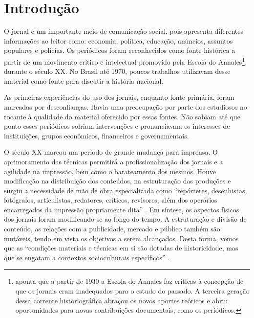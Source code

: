 \begin{refsection}
\begin{otherlanguage}{english}
    \end{otherlanguage}

    \section{Introdução}

    O jornal é um importante meio de comunicação social, pois apresenta diferentes informações ao leitor como: economia, política, educação, anúncios, assuntos populares e policias. Os periódicos foram reconhecidos como fonte histórica a partir de um movimento crítico e intelectual promovido pela Escola do Annales\footnote{\textcite{Lapuente2016Imprensa} aponta que a partir de 1930 a Escola do Annales faz críticas à concepção de que os jornais eram inadequados para o estudo do passado. A terceira geração dessa corrente historiográfica abraçou os novos aportes teóricos e abriu oportunidades para novas contribuições documentais, como os periódicos.}, durante o século XX. No Brasil até 1970, poucos trabalhos utilizavam desse material como fonte para discutir a história nacional. 

    As primeiras experiências do uso dos jornais, enquanto fonte primária, foram marcadas por desconfianças. Havia uma preocupação por parte dos estudiosos no tocante à qualidade do material oferecido por essas fontes. Não sabiam até que ponto esses periódicos sofriam intervenções e pronunciavam os interesses de instituições, grupos econômicos, financeiros e governamentais. 

    O século XX marcou um período de grande mudança para imprensa. O aprimoramento das técnicas permitirá a profissionalização dos jornais e a agilidade na impressão, bem como o barateamento dos mesmos.  Houve modificação na distribuição dos conteúdos, na estruturação das produções e surgiu a necessidade de mão de obra especializada como ``repórteres, desenhistas, fotógrafos, articulistas, redatores, críticos, revisores, além dos operários encarregados da impressão propriamente dita'' \cite[p.~138]{Luca2005Historia}. Em síntese, os aspectos físicos dos jornais foram modificando-se ao longo do tempo. A estruturação e divisão de conteúdo, as relações com a publicidade, mercado e público também são mutáveis, tendo em vista os objetivos a serem alcançados. Desta forma, vemos que as ``condições materiais e técnicas em si são dotadas de historicidade, mas que se engatam a contextos socioculturais específicos'' \cite[p.~138]{Luca2005Historia}.


\end{refsection}

